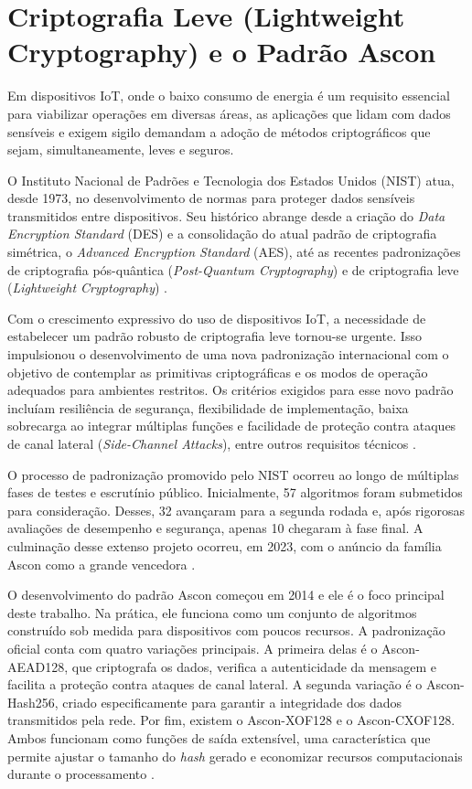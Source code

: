 \section{Criptografia Leve (Lightweight Cryptography) e o Padrão Ascon}
Em dispositivos IoT, onde o baixo consumo de energia é um requisito essencial para viabilizar operações em diversas áreas, as aplicações que lidam com dados sensíveis e exigem sigilo demandam a adoção de métodos criptográficos que sejam, simultaneamente, leves e seguros.

O Instituto Nacional de Padrões e Tecnologia dos Estados Unidos (NIST) atua, desde 1973, no desenvolvimento de normas para proteger dados sensíveis transmitidos entre dispositivos. Seu histórico abrange desde a criação do \textit{Data Encryption Standard} (DES) e a consolidação do atual padrão de criptografia simétrica, o \textit{Advanced Encryption Standard} (AES), até as recentes padronizações de criptografia pós-quântica (\textit{Post-Quantum Cryptography}) e de criptografia leve (\textit{Lightweight Cryptography}) \cite{chen2022cornerstone}.

Com o crescimento expressivo do uso de dispositivos IoT, a necessidade de estabelecer um padrão robusto de criptografia leve tornou-se urgente. Isso impulsionou o desenvolvimento de uma nova padronização internacional com o objetivo de contemplar as primitivas criptográficas e os modos de operação adequados para ambientes restritos. Os critérios exigidos para esse novo padrão incluíam resiliência de segurança, flexibilidade de implementação, baixa sobrecarga ao integrar múltiplas funções e facilidade de proteção contra ataques de canal lateral (\textit{Side-Channel Attacks}), entre outros requisitos técnicos \cite{nistir8114}.

O processo de padronização promovido pelo NIST ocorreu ao longo de múltiplas fases de testes e escrutínio público. Inicialmente, 57 algoritmos foram submetidos para consideração. Desses, 32 avançaram para a segunda rodada e, após rigorosas avaliações de desempenho e segurança, apenas 10 chegaram à fase final. A culminação desse extenso projeto ocorreu, em 2023, com o anúncio da família Ascon como a grande vencedora \cite{nistir8454}.

O desenvolvimento do padrão Ascon começou em 2014 e ele é o foco principal deste trabalho. Na prática, ele funciona como um conjunto de algoritmos construído sob medida para dispositivos com poucos recursos. A padronização oficial conta com quatro variações principais. A primeira delas é o Ascon-AEAD128, que criptografa os dados, verifica a autenticidade da mensagem e facilita a proteção contra ataques de canal lateral. A segunda variação é o Ascon-Hash256, criado especificamente para garantir a integridade dos dados transmitidos pela rede. Por fim, existem o Ascon-XOF128 e o Ascon-CXOF128. Ambos funcionam como funções de saída extensível, uma característica que permite ajustar o tamanho do \textit{hash} gerado e economizar recursos computacionais durante o processamento \cite{nist2025ascon}.

